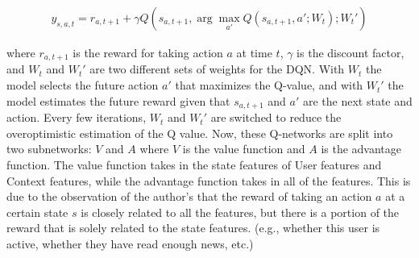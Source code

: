 \documentclass{ieeetj}
\begin{document}
\begin{equation}
\label{eq:Q function}
\begin{aligned}
	y_{s, a, t} = r_{a, t+1} + \gamma Q(s_{a, t+1}, \arg\max_{a'} Q(s_{a, t+1}, a'; W_t); W_t')
\end{aligned}
\end{equation}

where $r_{a, t+1}$ is the reward for taking action $a$ at time $t$, $\gamma$ is the discount factor, and $W_t$ and $W_t'$ are two different sets of weights for the DQN. With $W_t$ the model selects the future action $a'$ that maximizes the Q-value, and with $W_t'$ the model estimates the future reward given that $s_{a, t+1}$ and $a'$ are the next state and action. Every few iterations, $W_t$ and $W_t'$ are switched to reduce the overoptimistic estimation of the Q value. Now, these Q-networks are split into two subnetworks: $V$ and $A$ where $V$ is the value function and $A$ is the advantage function. The value function takes in the state features of User features and Context features, while the advantage function takes in all of the features. This is due to the observation of the author's that the reward of taking an action $a$ at a certain state $s$ is closely related to all the features, but there is a portion of the reward that is solely related to the state features. (e.g., whether this user is active, whether they have read enough news, etc.) 
	


\end{document}
